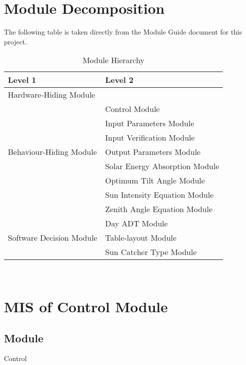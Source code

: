 \documentclass[12pt, titlepage]{article}
\begin{document}
\section{Module Decomposition}

The following table is taken directly from the Module Guide document for this
project.

\begin{table}[h!]
\centering
\begin{tabular}{p{} p{}}
\toprule
\textbf{Level 1} & \textbf{Level 2}\\
\midrule

{Hardware-Hiding Module} & ~ \\
\midrule

\multirow{7}{0.3\textwidth}{Behaviour-Hiding
 Module}& Control Module\\
& Input Parameters Module\\
& Input Verification Module\\
& Output Parameters Module\\
& Solar Energy Absorption Module\\
& Optimum Tilt Angle Module\\
& Sun Intensity Equation Module\\
& Zenith Angle Equation Module\\
\midrule

\multirow{3}{0.3\textwidth}{Software Decision Module} 
& Day ADT Module\\
& Table-layout Module\\
& Sun Catcher Type 
Module\\
\bottomrule

\end{tabular}
\caption{Module Hierarchy}
\label{TblMH}
\end{table}

\newpage
~\newpage


\section{MIS of Control Module} \label{ModuleC} 

\subsection{Module}
Control
\end{document}
